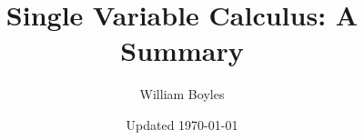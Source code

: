 


	\title{Single Variable Calculus: A Summary}
	\author{William Boyles}
	\date{Updated \today}
	
	\frontmatter
		\maketitle
		\tableofcontents
		
	
		
		
	\mainmatter
		
		
		
		
		
		
		
		
		
		
	\appendix
	
	\backmatter


